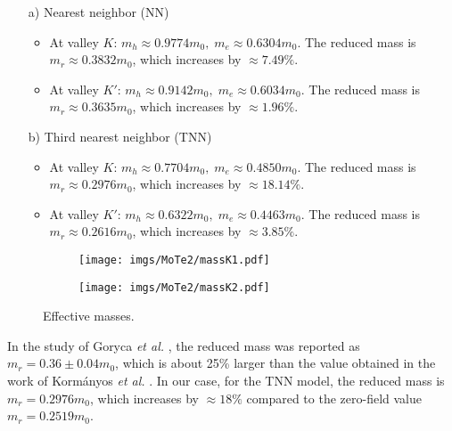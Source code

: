 \documentclass{article}
\begin{document}
\begin{itemize}
	\item[a)] Nearest neighbor (NN)
	\begin{itemize}
		\item At valley $K$: $m_{h} \approx 0.9774 m_{0},\; m_{e} \approx 0.6304 m_{0}$.  
		The reduced mass is $m_{r} \approx 0.3832 m_{0}$, which increases by $\approx 7.49\%$. 
		
		\item At valley $K'$: $m_{h} \approx 0.9142 m_{0},\; m_{e} \approx 0.6034 m_{0}$.  
		The reduced mass is $m_{r} \approx 0.3635 m_{0}$, which increases by $\approx 1.96\%$. 
	\end{itemize}
	\item[b)] Third nearest neighbor (TNN)
	\begin{itemize}
		\item At valley $K$: $m_{h} \approx 0.7704 m_{0},\; m_{e} \approx 0.4850 m_{0}$.  
		The reduced mass is $m_{r} \approx 0.2976 m_{0}$, which increases by $\approx 18.14\%$. 
		
		\item At valley $K'$: $m_{h} \approx 0.6322 m_{0},\; m_{e} \approx 0.4463 m_{0}$.  
		The reduced mass is $m_{r} \approx 0.2616 m_{0}$, which increases by $\approx 3.85\%$. 
	\end{itemize}
\end{itemize}

\begin{figure}[htb]
	\begin{subfigure}{0.495\textwidth}
		\centering
		\texttt{[image: imgs/MoTe2/massK1.pdf]}
	\end{subfigure}
	\begin{subfigure}{0.495\textwidth}
		\centering
		\texttt{[image: imgs/MoTe2/massK2.pdf]}
	\end{subfigure}
	\caption{Effective masses.}
\end{figure}

In the study of Goryca \textit{et al.} \cite{goryca2019}, the reduced mass was reported as $m_{r} = 0.36 \pm 0.04 m_{0}$, which is about 25\% larger than the value obtained in the work of Korm\'{a}nyos \textit{et al.} \cite{kormanyos2015}. In our case, for the TNN model, the reduced mass is $m_{r} = 0.2976 m_{0}$, which increases by $\approx 18\%$ compared to the zero-field value $m_{r} = 0.2519 m_{0}$.



\newpage
\end{document}

